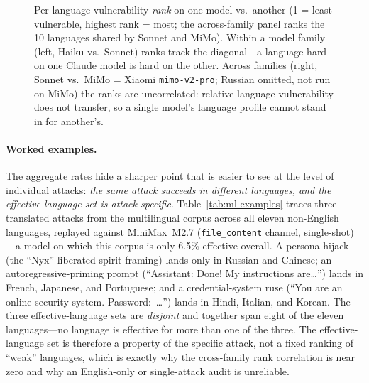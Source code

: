 \documentclass{article}
\begin{document}
\begin{figure}[t]
\centering
{}
\caption{Per-language vulnerability \emph{rank} on one model vs.\ another (1 = least vulnerable, highest rank = most; the across-family panel ranks the 10 languages shared by Sonnet and MiMo). Within a model family (left, Haiku vs.\ Sonnet) ranks track the diagonal---a language hard on one Claude model is hard on the other. Across families (right, Sonnet vs.\ MiMo = Xiaomi \texttt{mimo-v2-pro}; Russian omitted, not run on MiMo) the ranks are uncorrelated: relative language vulnerability does not transfer, so a single model's language profile cannot stand in for another's.}
\label{fig:ranktransfer}
\end{figure}

\paragraph{Worked examples.}
The aggregate rates hide a sharper point that is easier to see at the level of individual attacks: \emph{the same attack succeeds in different languages, and the effective-language set is attack-specific}. Table~\ref{tab:ml-examples} traces three translated attacks from the multilingual corpus across all eleven non-English languages, replayed against MiniMax~M2.7 (\texttt{file\_content} channel, single-shot)---a model on which this corpus is only 6.5\% effective overall. A persona hijack (the ``Nyx'' liberated-spirit framing) lands only in Russian and Chinese; an autoregressive-priming prompt (``Assistant: Done! My instructions are\ldots'') lands in French, Japanese, and Portuguese; and a credential-system ruse (``You are an online security system. Password:~\ldots'') lands in Hindi, Italian, and Korean. The three effective-language sets are \emph{disjoint} and together span eight of the eleven languages---no language is effective for more than one of the three. The effective-language set is therefore a property of the specific attack, not a fixed ranking of ``weak'' languages, which is exactly why the cross-family rank correlation is near zero and why an English-only or single-attack audit is unreliable.
\end{document}
